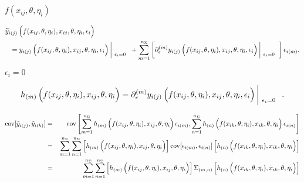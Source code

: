 \documentclass{article}
\begin{document}
$f(x_{ij}, \theta, \eta_i)$
\pagebreak

\begin{eqnarray} \lefteqn{ \widetilde{y}_{i(j)} \left( \rule{0.0in}{0.15in} f(x_{ij}, \theta, \eta_i), x_{ij}, \theta, \eta_i, \epsilon_i \right) } \nonumber \\ & & = y_{i(j)}\left( \rule{0.0in}{0.15in} f(x_{ij}, \theta, \eta_i), x_{ij}, \theta, \eta_i, \epsilon_i \right) \left| \! \begin{array}{l} \\ {\scriptstyle \epsilon_i = 0} \end{array} \right. + \sum_{m=1}^{n_{\Sigma}} \left[ \partial_{\epsilon}^{(m)} y_{i(j)}\left( \rule{0.0in}{0.15in} f(x_{ij}, \theta, \eta_i), x_{ij}, \theta, \eta_i, \epsilon_i \right) \left| \! \begin{array}{l} \\ {\scriptstyle \epsilon_i = 0} \end{array} \right. \right] \epsilon_{i(m)} . \end{eqnarray}
\pagebreak

$\epsilon_i = 0$
\pagebreak

\[ h_{(m)}\left( \rule{0.0in}{0.15in} f(x_{ij}, \theta, \eta_i), x_{ij}, \theta, \eta_i \right) = \partial_{\epsilon}^{(m)} y_{i(j)}\left( \rule{0.0in}{0.15in} f(x_{ij}, \theta, \eta_i), x_{ij}, \theta, \eta_i, \epsilon_i \right) \left| \! \begin{array}{l} \\ {\scriptstyle \epsilon_i = 0} \end{array} \right. . \]
\pagebreak

\begin{eqnarray} \mbox{cov} [ \tilde{y}_{i(j)} , \tilde{y}_{i(k)} ] & = & \mbox{cov} \left[ \sum_{m=1}^{n_{\Sigma}} h_{(m)}\left( \rule{0.0in}{0.15in} f(x_{ij}, \theta, \eta_i), x_{ij}, \theta, \eta_i \right) \epsilon_{i(m)}, \sum_{n=1}^{n_{\Sigma}} h_{(n)}\left( \rule{0.0in}{0.15in} f(x_{ik}, \theta, \eta_i), x_{ik}, \theta, \eta_i \right) \epsilon_{i(n)} \right] \\ & = & \sum_{m=1}^{n_{\Sigma}} \sum_{n=1}^{n_{\Sigma}} \left[ h_{(m)}\left( \rule{0.0in}{0.15in} f(x_{ij}, \theta, \eta_i), x_{ij}, \theta, \eta_i \right) \right] \mbox{cov} [ \epsilon_{i(m)} , \epsilon_{i(n)} ] \left[ h_{(n)}\left( \rule{0.0in}{0.15in} f(x_{ik}, \theta, \eta_i), x_{ik}, \theta, \eta_i \right) \right] \\ & = & \sum_{m=1}^{n_{\Sigma}} \sum_{n=1}^{n_{\Sigma}} \left[ h_{(m)}\left( \rule{0.0in}{0.15in} f(x_{ij}, \theta, \eta_i), x_{ij}, \theta, \eta_i \right) \right] \Sigma_{(m,n)} \left[ h_{(n)}\left( \rule{0.0in}{0.15in} f(x_{ik}, \theta, \eta_i), x_{ik}, \theta, \eta_i \right) \right] \end{eqnarray}
\pagebreak
\end{document}
